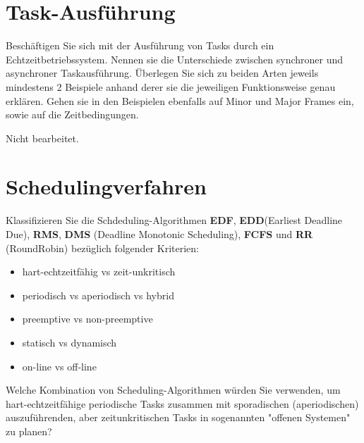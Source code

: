 \documentclass[12pt,a4paper,ngerman]{article}
\begin{document}


%
%

\section*{Task-Ausführung}


\begin{framed}
Beschäftigen Sie sich mit der Ausführung von Tasks durch ein Echtzeitbetriebssystem. Nennen sie die Unterschiede zwischen synchroner und asynchroner Taskausführung. Überlegen Sie sich zu beiden Arten jeweils mindestens 2 Beispiele anhand derer sie die jeweiligen Funktionsweise genau erklären. Gehen sie in den Beispielen ebenfalls auf Minor und Major Frames ein, sowie auf die Zeitbedingungen. 
\end{framed}
Nicht bearbeitet. 
\pagebreak
\section*{Schedulingverfahren}


\begin{framed}
Klassifizieren Sie die Schdeduling-Algorithmen \textbf{EDF}, \textbf{EDD}(Earliest Deadline Due), \textbf{RMS}, \textbf{DMS} (Deadline Monotonic Scheduling), \textbf{FCFS} und \textbf{RR} (RoundRobin) bezüglich folgender Kriterien:
\begin{itemize}
\item hart-echtzeitfähig vs zeit-unkritisch
\item periodisch vs aperiodisch vs hybrid
\item preemptive vs non-preemptive
\item statisch vs dynamisch
\item on-line vs off-line
\end{itemize}
Welche Kombination von Scheduling-Algorithmen würden Sie verwenden, um hart-echtzeitfähige periodische Tasks zusammen mit sporadischen (aperiodischen) auszuführenden, aber zeitunkritischen Tasks in sogenannten "offenen Systemen" zu planen?
\end{framed}
\end{document}
